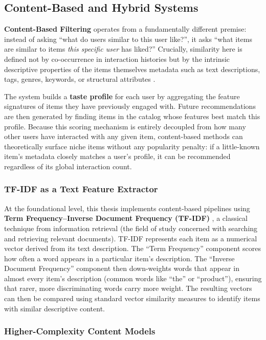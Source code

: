 \documentclass[11pt,a4paper]{report}
\begin{document}
\subsection{Content-Based and Hybrid Systems}

\textbf{Content-Based Filtering} operates from a fundamentally different premise: instead of asking ``what do users similar to this user like?'', it asks ``what items are similar to items \emph{this specific user} has liked?'' Crucially, similarity here is defined not by co-occurrence in interaction histories but by the intrinsic descriptive properties of the items themselves metadata such as text descriptions, tags, genres, keywords, or structural attributes \citep{lops2011contentbased}.

The system builds a \textbf{taste profile} for each user by aggregating the feature signatures of items they have previously engaged with. Future recommendations are then generated by finding items in the catalog whose features best match this profile. Because this scoring mechanism is entirely decoupled from how many other users have interacted with any given item, content-based methods can theoretically surface niche items without any popularity penalty: if a little-known item's metadata closely matches a user's profile, it can be recommended regardless of its global interaction count.

\subsubsection*{TF-IDF as a Text Feature Extractor}

At the foundational level, this thesis implements content-based pipelines using \textbf{Term Frequency--Inverse Document Frequency (TF-IDF)} \citep{manning2008introduction}, a classical technique from information retrieval (the field of study concerned with searching and retrieving relevant documents). TF-IDF represents each item as a numerical vector derived from its text description. The ``Term Frequency'' component scores how often a word appears in a particular item's description. The ``Inverse Document Frequency'' component then down-weights words that appear in almost every item's description (common words like ``the'' or ``product''), ensuring that rarer, more discriminating words carry more weight. The resulting vectors can then be compared using standard vector similarity measures to identify items with similar descriptive content.

\subsubsection*{Higher-Complexity Content Models}
\end{document}
